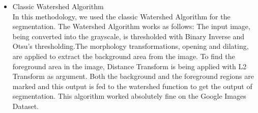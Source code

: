 \documentclass[12pt,a4paper]{article}
\begin{document}
\begin{itemize}


%
    

%
\newpage

\item Classic Watershed Algorithm \\

In this methodology, we used the classic Watershed Algorithm for the segmentation. The Watershed Algorithm works as follows: The input image, being converted into the grayscale, is thresholded with Binary Inverse and Otsu's thresholding.The morphology transformations, opening and dilating, are applied to extract the background area from the image. To find the foreground area in the image, Distance Transform is being applied with L2 Transform as argument. Both the background and the foreground regions are marked and this output is fed to the watershed function to get the output of segmentation. This algorithm worked absolutely fine on the Google Images Dataset.
    


\end{itemize}
\end{document}
